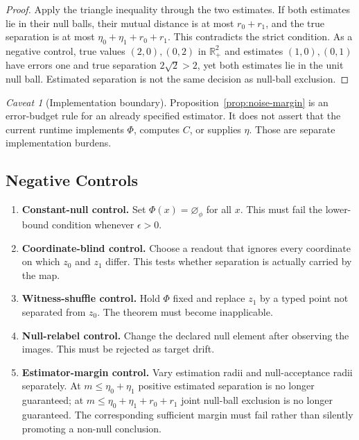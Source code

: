 \documentclass[11pt,a4paper]{article}
\theoremstyle{plain}
\theoremstyle{definition}
\theoremstyle{remark}
\newtheorem{caveat}[theorem]{Caveat}
\newcommand{\nullphi}{\varnothing_\phi}
\begin{document}
\begin{proof}
Apply the triangle inequality through the two estimates. If both estimates lie in their null balls, their mutual distance is at most $r_0+r_1$, and the true separation is at most $\eta_0+\eta_1+r_0+r_1$. This contradicts the strict condition. As a negative control, true values $(2,0),(0,2)$ in $\mathbb R_+^2$ and estimates $(1,0),(0,1)$ have errors one and true separation $2\sqrt2>2$, yet both estimates lie in the unit null ball. Estimated separation is not the same decision as null-ball exclusion.
\end{proof}

\begin{caveat}[Implementation boundary]
Proposition~\ref{prop:noise-margin} is an error-budget rule for an already specified estimator. It does not assert that the current runtime implements $\Phi$, computes $C$, or supplies $\eta$. Those are separate implementation burdens.
\end{caveat}

\subsection{Negative Controls}

\begin{enumerate}
\item \textbf{Constant-null control.} Set $\Phi(x)=\nullphi$ for all $x$. This must fail the lower-bound condition whenever $\epsilon>0$.
\item \textbf{Coordinate-blind control.} Choose a readout that ignores every coordinate on which $z_0$ and $z_1$ differ. This tests whether separation is actually carried by the map.
\item \textbf{Witness-shuffle control.} Hold $\Phi$ fixed and replace $z_1$ by a typed point not separated from $z_0$. The theorem must become inapplicable.
\item \textbf{Null-relabel control.} Change the declared null element after observing the images. This must be rejected as target drift.
\item \textbf{Estimator-margin control.} Vary estimation radii and null-acceptance radii separately. At $m\leq\eta_0+\eta_1$ positive estimated separation is no longer guaranteed; at $m\leq\eta_0+\eta_1+r_0+r_1$ joint null-ball exclusion is no longer guaranteed. The corresponding sufficient margin must fail rather than silently promoting a non-null conclusion.
\end{enumerate}
\end{document}
